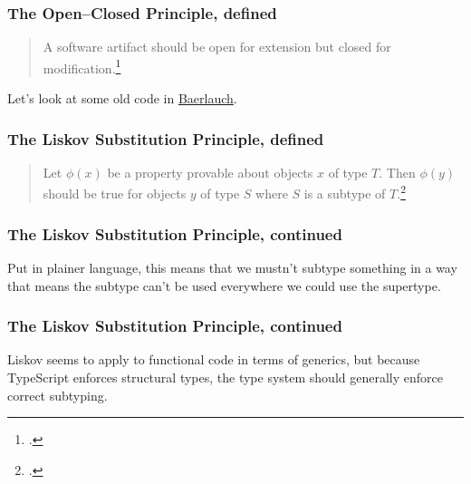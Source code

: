\documentclass[aspectratio=169]{beamer}
\begin{document}
\begin{frame}[fragile]
  \frametitle{The Open--Closed Principle, defined}

  \begin{quote}
    A software artifact should be open for extension but closed for
    modification.\footnote{\cite[p.~70]{clean-arch}.}
  \end{quote}

  Let's look at some old code in \href{https://github.com/Spoonflower/baerlauch/blob/de1ea0d44b9479968705b31c4d1c89a8ad3b37de/app/assets/javascripts/react/components/Product/ProductForm.js\#L178-L197}{Baerlauch}.

\end{frame}


\begin{frame}
  \frametitle{The Liskov Substitution Principle, defined}

  \begin{quote}
    Let $\phi(x)$ be a property provable about objects $x$ of type $T$. Then
    $\phi(y)$  should be true for objects $y$ of type $S$ where $S$
    is a subtype of $T$.\footnote{\cite[p.~1812]{liskov}.}
  \end{quote}
\end{frame}


\begin{frame}
  \frametitle{The Liskov Substitution Principle, continued}

  Put in plainer language, this means that we mustn't subtype something in a way
  that means the subtype can't be used everywhere we could use the supertype.

\end{frame}


\begin{frame}
  \frametitle{The Liskov Substitution Principle, continued}

  Liskov seems to apply to functional code in terms of generics, but because
  TypeScript enforces structural types, the type system should generally enforce
  correct subtyping.

\end{frame}
\end{document}
